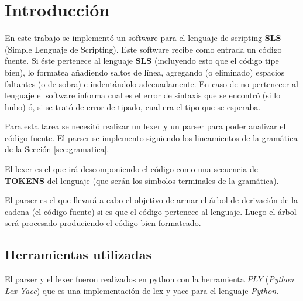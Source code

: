 \section{Introducción}

	En este trabajo se implementó un software para el lenguaje de scripting
	\textbf{SLS} (Simple Lenguaje de Scripting). Este software recibe como entrada
	un código fuente. Si éste pertenece al lenguaje \textbf{SLS} (incluyendo
	esto que el código tipe bien), lo formatea añadiendo saltos de línea,
	agregando (o eliminado) espacios faltantes (o de sobra) e indentándolo
	adecuadamente. En caso de no pertenecer al lenguaje el software informa cual es el
	error de sintaxis que se encontró (si lo hubo) ó, si se trató de
	error de tipado, cual era el tipo que se esperaba.
	
	Para esta tarea se necesitó realizar un lexer y un parser
	para poder analizar el código fuente. El parser se implemento siguiendo
	los lineamientos de la gramática de la Sección \ref{sec:gramatica}.
	
	El lexer es el que irá descomponiendo el código como una secuencia 
	de \textbf{TOKENS} del lenguaje (que serán los símbolos terminales de la gramática).

	El parser es el que llevará a cabo el objetivo de armar el árbol
	de derivación de la cadena (el código fuente) si es que el código pertenece al lenguaje.
	Luego el árbol será procesado produciendo el código bien formateado.

\subsection{Herramientas utilizadas}
	El parser y el lexer fueron realizados en python con la herramienta
	$PLY$ (\textit{Python Lex-Yacc}) que es una implementación de lex y yacc para
	el lenguaje \textit{Python}.

\newpage

